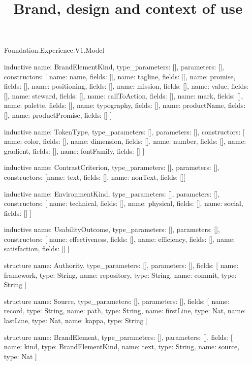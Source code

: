 \begin{lexlean}{Foundation.Experience.V1.Model}
\title{Brand, design and context of use}
\begin{semanticmodule}
inductive{
  name: BrandElementKind,
  type_parameters: [],
  parameters: [],
  constructors: [
    {name: name, fields: []},
    {name: tagline, fields: []},
    {name: promise, fields: []},
    {name: positioning, fields: []},
    {name: mission, fields: []},
    {name: value, fields: []},
    {name: steward, fields: []},
    {name: callToAction, fields: []},
    {name: mark, fields: []},
    {name: palette, fields: []},
    {name: typography, fields: []},
    {name: productName, fields: []},
    {name: productPromise, fields: []}
  ]
}

inductive{
  name: TokenType,
  type_parameters: [],
  parameters: [],
  constructors: [
    {name: color, fields: []},
    {name: dimension, fields: []},
    {name: number, fields: []},
    {name: gradient, fields: []},
    {name: fontFamily, fields: []}
  ]
}

inductive{
  name: ContrastCriterion,
  type_parameters: [],
  parameters: [],
  constructors: [{name: text, fields: []}, {name: nonText, fields: []}]
}

inductive{
  name: EnvironmentKind,
  type_parameters: [],
  parameters: [],
  constructors: [
    {name: technical, fields: []},
    {name: physical, fields: []},
    {name: social, fields: []}
  ]
}

inductive{
  name: UsabilityOutcome,
  type_parameters: [],
  parameters: [],
  constructors: [
    {name: effectiveness, fields: []},
    {name: efficiency, fields: []},
    {name: satisfaction, fields: []}
  ]
}

structure{
  name: Authority,
  type_parameters: [],
  parameters: [],
  fields: [
    {name: framework, type: String},
    {name: repository, type: String},
    {name: commit, type: String}
  ]
}

structure{
  name: Source,
  type_parameters: [],
  parameters: [],
  fields: [
    {name: record, type: String},
    {name: path, type: String},
    {name: firstLine, type: Nat},
    {name: lastLine, type: Nat},
    {name: kappa, type: String}
  ]
}

structure{
  name: BrandElement,
  type_parameters: [],
  parameters: [],
  fields: [
    {name: kind, type: BrandElementKind},
    {name: text, type: String},
    {name: source, type: Nat}
  ]
}


\end{semanticmodule}
\end{lexlean}
